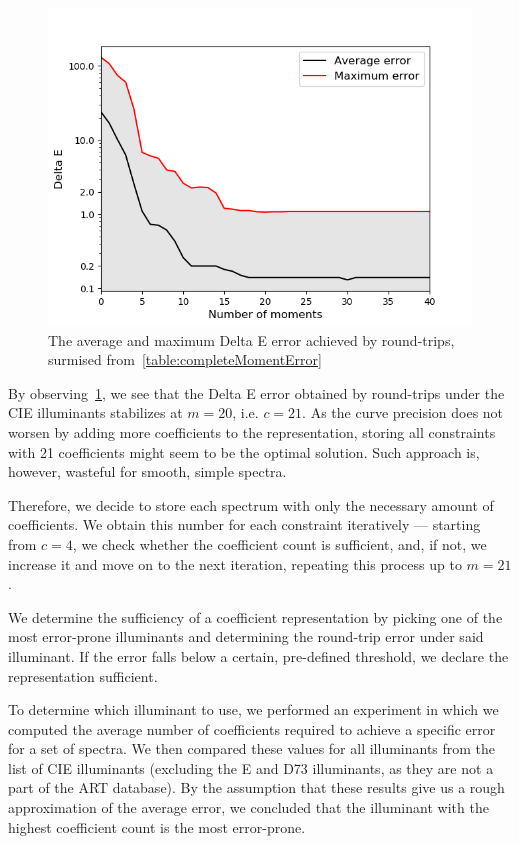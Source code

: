 \begin{figure}[t!]
	\centering
	\includegraphics[width=0.6\linewidth]{img/results_noOfMoments_deltaE.png}
	\caption{The average and maximum Delta E error achieved by round-trips, surmised from~\cref{table:completeMomentError}}
	\label{fig:results_noOfMoments_deltaE}
\end{figure}

By observing~\cref{fig:results_noOfMoments_deltaE}, we see that the Delta E error obtained by round-trips under the CIE illuminants stabilizes at $m=20$, i.e. $c=21$. As the curve precision does not worsen by adding more coefficients to the representation, storing all constraints with 21 coefficients might seem to be the optimal solution. Such approach is, however, wasteful for smooth, simple spectra.

Therefore, we decide to store each spectrum with only the necessary amount of coefficients. We obtain this number for each constraint iteratively --- starting from $c=4$, we check whether the coefficient count is sufficient, and, if not, we increase it and move on to the next iteration, repeating this process up to $m=21$.

We determine the sufficiency of a coefficient representation by picking one of the most error-prone illuminants and determining the round-trip error under said illuminant. If the error falls below a certain, pre-defined threshold, we declare the representation sufficient.

To determine which illuminant to use, we performed an experiment in which we computed the average number of coefficients required to achieve a specific error for a set of spectra. We then compared these values for all illuminants from the list of CIE illuminants (excluding the E and D73 illuminants, as they are not a part of the ART database). By the assumption that these results give us a rough approximation of the average error, we concluded that the illuminant with the highest coefficient count is the most error-prone.

